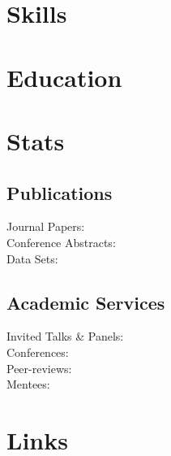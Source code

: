 \documentclass[]{deedy-resume-openfont}
\begin{document}
\begin{minipage}[t]{0.33\textwidth} 





\section{Skills}


\section{Education}

\sectionsep

\section{Stats}
\subsection{Publications}
Journal Papers: \journalpapers
\\
Conference Abstracts: \conferences
\\
Data Sets: \datasets
\sectionsep
\subsection{Academic Services}
Invited Talks \& Panels: \invitedtalks
\\
Conferences: \conferenceevents
\\
Peer-reviews: \peerreviews
\\
Mentees: \mentees
\sectionsep

\section{Links}


\sectionsep
%
%

\end{minipage} 
\end{document}
